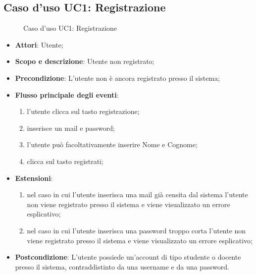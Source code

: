 \documentclass[12pt,a4paper]{article}
\begin{document}
\subsection{Caso d'uso UC1: Registrazione}
\begin{figure}[H]
	\centering

	\caption{Caso d'uso UC1: Registrazione}\label{fig:UC1} 
\end{figure}\begin{itemize}
\item \textbf{Attori}: Utente;
\item \textbf{Scopo e descrizione}: Utente non registrato; 
\item \textbf{Precondizione}: L’utente non è ancora registrato presso il sistema;

\item \textbf{Flusso principale degli eventi}:
\begin{enumerate}
	\item l'utente clicca sul tasto registrazione;
	\item inserisce un mail e password;
	\item l'utente può facoltativamente inserire Nome e Cognome;
	\item clicca sul tasto registrati;
	
\end{enumerate}
\item \textbf{Estensioni}:
\begin{enumerate}
	\item nel caso in cui l’utente inserisca una mail già censita dal sistema l’utente non viene registrato presso il sistema e viene visualizzato un errore esplicativo;
	\item nel caso in cui l’utente inserisca una password troppo corta l’utente non viene registrato presso il sistema e viene visualizzato un errore esplicativo;
	
\end{enumerate}
\item \textbf{Postcondizione}: L’utente possiede un’account di tipo studente o docente presso il sistema, contraddistinto da una username e da una password.
\end{itemize}
\hypertarget{UC2}{}
\end{document}
